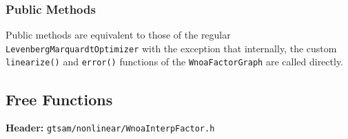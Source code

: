 \documentclass[11pt]{report}
\begin{document}
\subsubsection*{Public Methods}

Public methods are equivalent to those of the regular \texttt{LevenbergMarquardtOptimizer} with the exception that internally, the custom \texttt{linearize()} and \texttt{error()} functions of the \texttt{WnoaFactorGraph} are called directly.

\newpage
\subsection*{Free Functions}
\label{sec:api-free-functions}

\textbf{Header:} \texttt{gtsam/nonlinear/WnoaInterpFactor.h}
\end{document}
